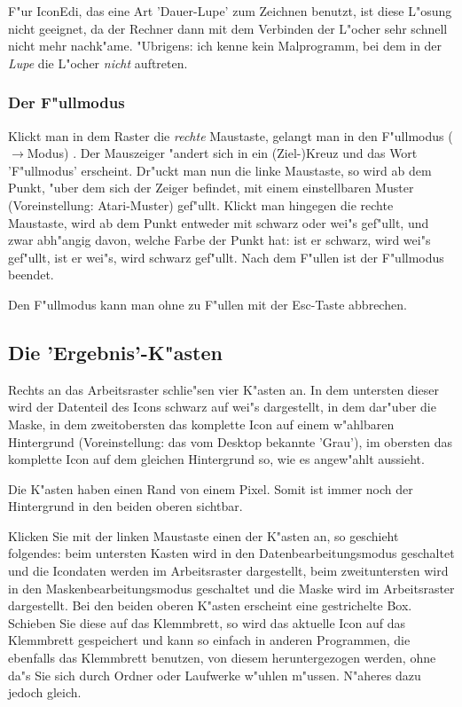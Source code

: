 F"ur IconEdi, das eine Art 'Dauer-Lupe' zum Zeichnen benutzt, ist 
diese L"osung nicht geeignet, da der Rechner dann mit dem Verbinden 
der L"ocher sehr schnell nicht mehr nachk"ame. "Ubrigens: ich kenne 
kein Malprogramm, bei dem in der {\sl Lupe} die L"ocher {\sl nicht} 
auftreten.

\subsubsection{Der F"ullmodus} 
Klickt man in dem Raster die {\sl rechte} Maustaste, gelangt man 
in den F"ullmodus ($\to$Modus) . Der Mauszeiger 
"andert sich in ein (Ziel-)Kreuz und das Wort 'F"ullmodus' 
erscheint. Dr"uckt man nun die linke Maustaste, so wird ab dem 
Punkt, "uber dem sich der Zeiger befindet, mit einem einstellbaren 
Muster (Voreinstellung: Atari-Muster) gef"ullt. Klickt man hingegen 
die rechte Maustaste, wird ab dem Punkt entweder mit schwarz oder 
wei"s gef"ullt, und zwar abh"angig davon, welche Farbe der Punkt hat: 
ist er schwarz, wird wei"s gef"ullt, ist er wei"s, wird schwarz 
gef"ullt. Nach dem F"ullen ist der F"ullmodus beendet.

Den F"ullmodus kann man ohne zu F"ullen mit der Esc-Taste abbrechen.

\subsection{Die 'Ergebnis'-K"asten} 
Rechts an das Arbeitsraster schlie"sen vier K"asten an. In dem 
untersten dieser wird der Datenteil des Icons schwarz auf wei"s 
dargestellt, in dem dar"uber die Maske, in dem zweitobersten das 
komplette Icon auf einem w"ahlbaren Hintergrund (Voreinstellung: 
das vom Desktop bekannte 'Grau'), im obersten das komplette Icon 
auf dem gleichen Hintergrund so, wie es angew"ahlt aussieht.

Die K"asten haben einen Rand von einem Pixel. Somit ist immer noch 
der Hintergrund in den beiden oberen sichtbar.

Klicken Sie mit der linken Maustaste einen der K"asten an, so 
geschieht folgendes: beim untersten Kasten wird in den 
Datenbearbeitungsmodus geschaltet und die Icondaten werden im 
Arbeitsraster dargestellt, beim zweituntersten wird in den 
Maskenbearbeitungsmodus geschaltet und die Maske wird im 
Arbeitsraster dargestellt. Bei den beiden oberen K"asten erscheint 
eine gestrichelte Box. Schieben Sie diese auf das Klemmbrett, 
so wird das aktuelle Icon auf das Klemmbrett gespeichert und kann 
so einfach in anderen Programmen, die ebenfalls das Klemmbrett 
benutzen, von diesem heruntergezogen werden, ohne da"s Sie sich 
durch Ordner oder Laufwerke w"uhlen m"ussen. N"aheres dazu jedoch 
gleich.


